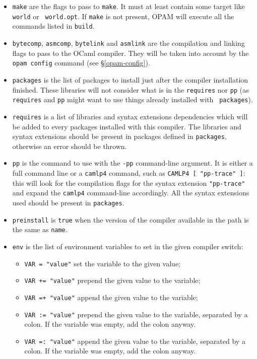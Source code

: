 \documentclass[a4paper,11pt]{article}
\begin{document}
\begin{itemize}
\item {\tt make} are the flags to pass to {\tt make}.
  It must at least contain some target like {\tt world} or {\tt
    world.opt}. If {\tt make} is not present, OPAM will execute all
  the commands listed in {\tt build}.

\item {\tt bytecomp}, {\tt asmcomp}, {\tt bytelink} and {\tt asmlink}
  are the compilation and linking flags to pass to the OCaml
  compiler. They will be taken into account by the \verb+opam config+
  command (see \S\ref{opam-config}).

\item {\tt packages} is the list of packages to install just after the
  compiler installation finished. These libraries will not consider
  what is in the {\tt requires} nor {\tt pp} (as {\tt requires} and
  {\tt pp} might want to use things already installed with {\tt
    packages}).

\item {\tt requires} is a list of libraries and syntax extensions
  dependencies which will be added to every packages installed with
  this compiler. The libraries and syntax extensions should be present
  in packages defined in {\tt packages}, otherwise an error should be
  thrown.

\item {\tt pp} is the command to use with the {\tt -pp} command-line
  argument. It is either a full command line or a {\tt camlp4} command,
  such as \verb+CAMLP4 [ "pp-trace" ]+: this will look for the
  compilation flags for the syntax extension \verb+"pp-trace"+ and expand
  the {\tt camlp4} command-line accordingly. All the syntax extensions used
  should be present in {\tt packages}.

\item {\tt preinstall} is {\tt true} when the version of the compiler available
  in the path is the same as {\tt name}.

\item {\tt env} is the list of environment variables to set in the
  given compiler switch:
\begin{itemize}
\item {\tt VAR = "value"} set the variable to the given value;
\item {\tt VAR += "value"} prepend the given value to the variable;
\item {\tt VAR =+ "value"} append the given value to the variable;
\item {\tt VAR := "value"} prepend the given value to the variable,
  separated by a colon. If the variable was empty, add the
  colon anyway.
\item {\tt VAR =: "value"} append the given value to the variable,
  separated by a colon. If the variable was empty, add the colon
  anyway.
\end{itemize}
\end{itemize}
\end{document}
